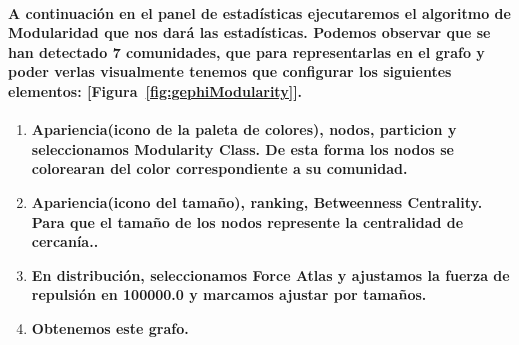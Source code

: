 \documentclass[11pt,spanish]{article}
\begin{document}
\paragraph*{A continuación en el panel de estadísticas ejecutaremos el algoritmo de Modularidad que nos dará las estadísticas. 
Podemos observar que se han detectado 7 comunidades, que para representarlas en el grafo y poder verlas visualmente tenemos que configurar los siguientes elementos: [Figura~\ref{fig:gephiModularity}].}
\begin{enumerate}
	\item \textbf{Apariencia(icono de la paleta de colores), nodos, particion y seleccionamos Modularity Class. De esta forma los nodos se colorearan del color correspondiente a su comunidad.}
	\item \textbf{Apariencia(icono del tamaño), ranking, Betweenness Centrality. Para que el tamaño de los nodos represente la centralidad de cercanía..}
	\item \textbf{En distribución, seleccionamos Force Atlas y ajustamos la fuerza de repulsión en 100000.0 y marcamos ajustar por tamaños.}
	\item \textbf{Obtenemos este grafo. }
\end{enumerate}
\end{document}
